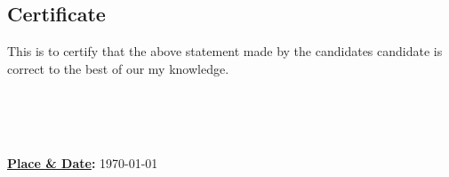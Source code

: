 \begin{minipage}{\textwidth}
\begin{flushleft}
    \end{flushleft}
\end{minipage}

\vfill

\begin{minipage}{\textwidth}
    \begin{flushleft}
        {\let\clearpage\relax\chapter*{\centering \huge Certificate}}

        This is to certify that the above statement made by the
        \ifdefined\twoAuthor candidates \else candidate \fi
        is correct to the best of
        \ifdefined\multipleadvisors our \else my \fi
        knowledge.

        \vspace{0.4in}

        \begin{minipage}{0.45\textwidth}
            \begin{flushleft}
                \textbf{\advisorone}
                \textbf{
                    \ifx\advisortwo\empty\else    \\\advisortwo\fi
                    \ifx\advisorthree\empty\else  \\\advisorthree\fi
                    \ifx\advisorfour\empty\else   \\\advisorfour\fi
                }
            \end{flushleft}
        \end{minipage}%
        \hfill
        \begin{minipage}{0.45\textwidth}
            \textbf{\underline{Place \& Date}:} \today
        \end{minipage}%
    \end{flushleft}
\end{minipage}

\newpage
